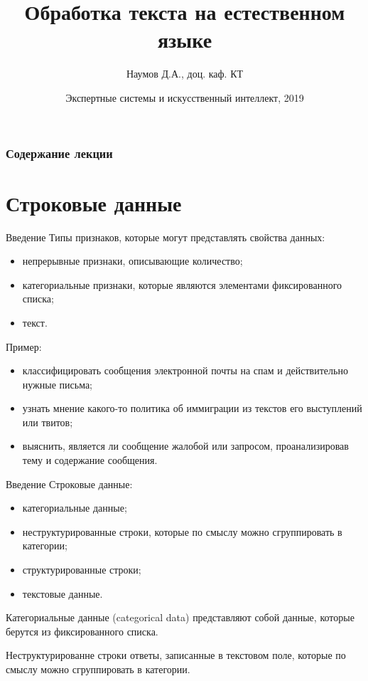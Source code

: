 \documentclass{beamer}
\title[Artifical Intelligence]{Обработка текста на естественном языке}
\author{Наумов Д.А., доц. каф. КТ}
\date[26.02.2020] {Экспертные системы и искусственный интеллект, 2019}
\begin{document}
\begin{frame}
  \titlepage
\end{frame}
  
\begin{frame}
  \frametitle{Содержание лекции}
  \tableofcontents  
\end{frame}

\section{Строковые данные}

\begin{frame}{Введение}
Типы признаков, которые могут представлять свойства данных:
\begin{itemize}
\item непрерывные признаки, описывающие количество;
\item категориальные признаки, которые являются элементами фиксированного списка;
\item текст.
\end{itemize}
Пример: 
\begin{itemize}
\item классифицировать сообщения электронной почты на спам и действительно нужные письма;
\item узнать мнение какого-то политика об иммиграции из текстов его выступлений или твитов;
\item выяснить, является ли сообщение жалобой или запросом, проанализировав тему и содержание сообщения.
\end{itemize}
\end{frame}

\begin{frame}{Введение}
Строковые данные:
\begin{itemize}
\item категориальные данные;
\item неструктурированные строки, которые по смыслу можно сгруппировать в категории;
\item структурированные строки;
\item текстовые данные.
\end{itemize}
\begin{block}{Категориальные данные (categorical data)}
представляют собой данные, которые берутся из фиксированного списка. 
\end{block}
\begin{block}{Неструктурированне строки}
ответы, записанные в текстовом поле, которые по смыслу можно сгруппировать в категории.
\end{block}
\end{frame}
\end{document}
